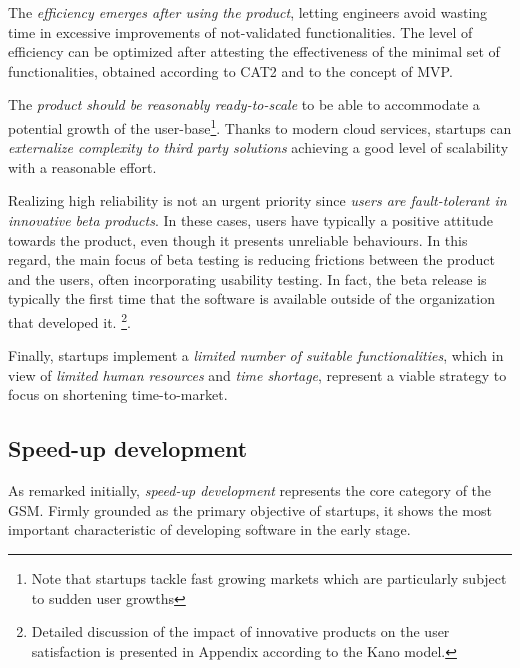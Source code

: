 \documentclass[10pt,journal,letterpaper,compsoc]{IEEEtran}
\begin{document}
\begin{compactitem}

\item The \textit{efficiency emerges after using the product}, letting 
engineers avoid wasting time in excessive improvements of not-validated 
functionalities. The level of efficiency can be optimized after attesting the 
effectiveness of the minimal set of functionalities, obtained according to CAT2 
and to the concept of MVP.
\item The \textit{product should be reasonably ready-to-scale} to be able to 
accommodate a potential growth of the user-base\footnote{Note that startups 
tackle fast growing markets which are particularly subject to sudden user 
growths}. Thanks to modern cloud services, startups can \textit{externalize 
complexity to third party solutions} achieving a good level of scalability with 
a reasonable effort.
\item Realizing high reliability is not an urgent priority since \textit{users 
are fault-tolerant in innovative beta products}. In these cases, users have 
typically a positive attitude towards the product, even though it presents 
unreliable behaviours. In this regard, the main focus of beta testing is 
reducing frictions between the product and the users, often incorporating 
usability testing. In fact, the beta release is typically the first time that 
the software is available outside of the organization that developed it. 
\footnote{Detailed discussion of the impact of innovative products on the user 
satisfaction is presented in Appendix according to the Kano model.}.
\end{compactitem}


Finally, startups implement a \textit{limited number of suitable 
functionalities}, which in view of \textit{limited human resources} and 
\textit{time shortage}, represent a viable strategy to focus on shortening 
time-to-market.
\subsection{Speed-up development}
\label{res:gsm:cat1}
As remarked initially, \textit{speed-up development} represents the core 
category of the GSM. Firmly grounded as the primary objective of startups, it 
shows the most important characteristic of developing software in the early 
stage.
\end{document}
